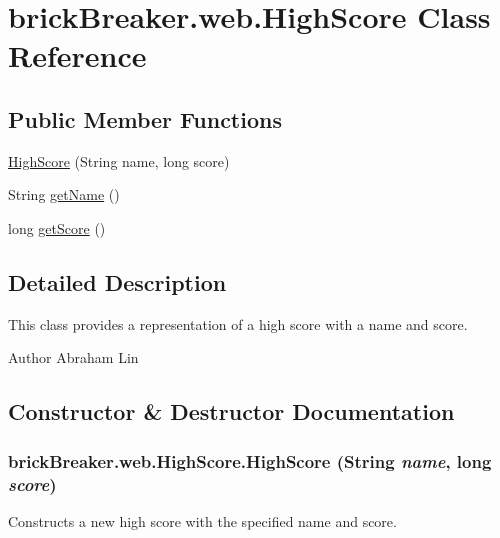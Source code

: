 \hypertarget{classbrick_breaker_1_1web_1_1_high_score}{
\section{brickBreaker.web.HighScore Class Reference}
\label{classbrick_breaker_1_1web_1_1_high_score}
}
\subsection*{Public Member Functions}
\begin{DoxyCompactItemize}
\item 
\hyperlink{classbrick_breaker_1_1web_1_1_high_score_abf16c56c51bfefd032d36228ddb8324d}{HighScore} (String name, long score)
\item 
String \hyperlink{classbrick_breaker_1_1web_1_1_high_score_afc959404f76813aeb079bf435bb6a52d}{getName} ()
\item 
long \hyperlink{classbrick_breaker_1_1web_1_1_high_score_a8f8c2b28d7975e261286f5dfb6d62752}{getScore} ()
\end{DoxyCompactItemize}


\subsection{Detailed Description}
This class provides a representation of a high score with a name and score.

\begin{DoxyAuthor}{Author}
Abraham Lin 
\end{DoxyAuthor}


\subsection{Constructor \& Destructor Documentation}
\hypertarget{classbrick_breaker_1_1web_1_1_high_score_abf16c56c51bfefd032d36228ddb8324d}{
\subsubsection[{HighScore}]{\setlength{\rightskip}{0pt plus 5cm}brickBreaker.web.HighScore.HighScore (String {\em name}, \/  long {\em score})}}
\label{classbrick_breaker_1_1web_1_1_high_score_abf16c56c51bfefd032d36228ddb8324d}
Constructs a new high score with the specified name and score.


